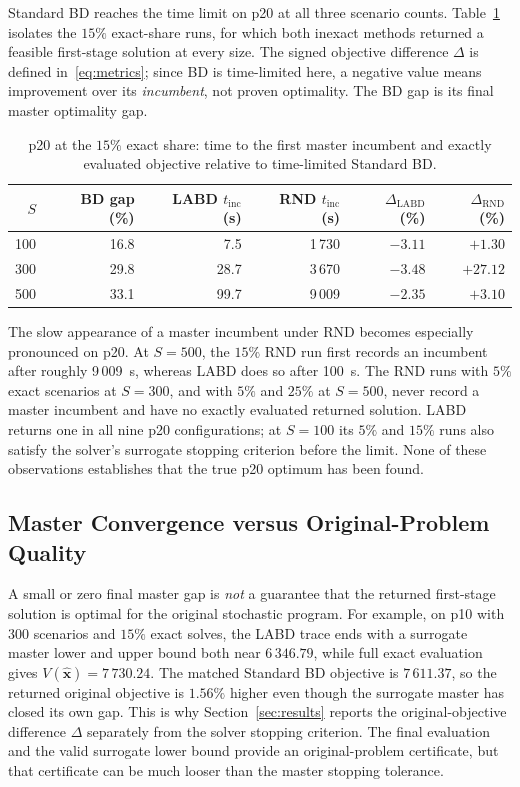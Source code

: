 Standard BD reaches the time limit on p20 at all three scenario counts. Table~\ref{tab:trace-p20} isolates the $15\%$ exact-share runs, for which both inexact methods returned a feasible first-stage solution at every size. The signed objective difference $\Delta$ is defined in~\eqref{eq:metrics}; since BD is time-limited here, a negative value means improvement over its \emph{incumbent}, not proven optimality. The BD gap is its final master optimality gap.

\begin{table}[ht]
\centering
\caption{p20 at the $15\%$ exact share: time to the first master incumbent and exactly evaluated objective relative to time-limited Standard BD.}
\label{tab:trace-p20}
\scriptsize
\setlength{\tabcolsep}{4pt}
\begin{tabular}{r r r r r r}
\toprule
$S$ & BD gap (\%) & LABD $t_{\mathrm{inc}}$ (s) & RND $t_{\mathrm{inc}}$ (s) & $\Delta_{\mathrm{LABD}}$ (\%) & $\Delta_{\mathrm{RND}}$ (\%)\\
\midrule
100 & 16.8 & 7.5  & 1\,730 & $-3.11$ & $+1.30$\\
300 & 29.8 & 28.7 & 3\,670 & $-3.48$ & $+27.12$\\
500 & 33.1 & 99.7 & 9\,009 & $-2.35$ & $+3.10$\\
\bottomrule
\end{tabular}
\end{table}

The slow appearance of a master incumbent under RND becomes especially pronounced on p20. At $S=500$, the $15\%$ RND run first records an incumbent after roughly 9\,009~s, whereas LABD does so after 100~s. The RND runs with $5\%$ exact scenarios at $S=300$, and with $5\%$ and $25\%$ at $S=500$, never record a master incumbent and have no exactly evaluated returned solution. LABD returns one in all nine p20 configurations; at $S=100$ its $5\%$ and $15\%$ runs also satisfy the solver's surrogate stopping criterion before the limit. None of these observations establishes that the true p20 optimum has been found.

\subsection{Master Convergence versus Original-Problem Quality}\label{app:trace-gaps}

A small or zero final master gap is \emph{not} a guarantee that the returned first-stage solution is optimal for the original stochastic program. For example, on p10 with 300 scenarios and $15\%$ exact solves, the LABD trace ends with a surrogate master lower and upper bound both near $6\,346.79$, while full exact evaluation gives $V(\widehat{\mathbf x})=7\,730.24$. The matched Standard BD objective is $7\,611.37$, so the returned original objective is $1.56\%$ higher even though the surrogate master has closed its own gap. This is why Section~\ref{sec:results} reports the original-objective difference $\Delta$ separately from the solver stopping criterion. The final evaluation and the valid surrogate lower bound provide an original-problem certificate, but that certificate can be much looser than the master stopping tolerance.

